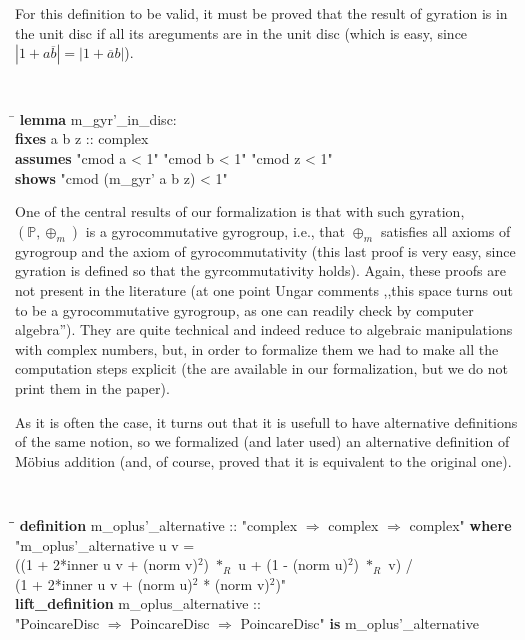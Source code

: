 \documentclass[a4paper]{article}
\theoremstyle{definition}
\begin{document}
For this definition to be valid, it must be proved that the result of
gyration is in the unit disc if all its areguments are in the unit
disc (which is easy, since $|1+a\overline{b}| = |1+\overline{a}b|$).

{\tt
\begin{small}
\begin{tabbing}
\hspace{5mm}\=\kill
{\bf lemma} m\_gyr'\_in\_disc:\\
\>  {\bf fixes} a b z :: complex\\
\>  {\bf assumes} "cmod a < 1" "cmod b < 1" "cmod z < 1"\\
\>  {\bf shows} "cmod (m\_gyr' a b z) < 1"
\end{tabbing}
\end{small}
}

One of the central results of our formalization is that with such
gyration, $(\mathbb{P}, \oplus_m)$ is a gyrocommutative gyrogroup,
i.e., that $\oplus_m$ satisfies all axioms of gyrogroup and the axiom
of gyrocommutativity (this last proof is very easy, since gyration is
defined so that the gyrcommutativity holds). Again, these proofs are
not present in the literature (at one point Ungar comments ,,this
space turns out to be a gyrocommutative gyrogroup, as one can readily
check by computer algebra''). They are quite technical and indeed
reduce to algebraic manipulations with complex numbers, but, in order
to formalize them we had to make all the computation steps explicit
(the are available in our formalization, but we do not print them in
the paper).

As it is often the case, it turns out that it is usefull to have
alternative definitions of the same notion, so we formalized (and
later used) an alternative definition of M\"obius addition (and, of
course, proved that it is equivalent to the original one).

{\tt
\begin{small}
\begin{tabbing}
\hspace{5mm}\=\hspace{5mm}\=\kill
{\bf definition} m\_oplus'\_alternative :: "complex $\Rightarrow$ complex $\Rightarrow$ complex" {\bf where} \\
\>  "m\_oplus'\_alternative u v =\\
\>\>      ((1 + 2*inner u v + (norm v)$^2$) $*_R$ u + (1 - (norm u)$^2$) $*_R$ v) / \\
\>\>       (1 + 2*inner u v + (norm u)$^2$ * (norm v)$^2$)"\\
{\bf lift\_definition} m\_oplus\_alternative ::\\
\> "PoincareDisc $\Rightarrow$ PoincareDisc $\Rightarrow$ PoincareDisc" {\bf is} m\_oplus'\_alternative
\end{tabbing}
\end{small}
}
\end{document}
